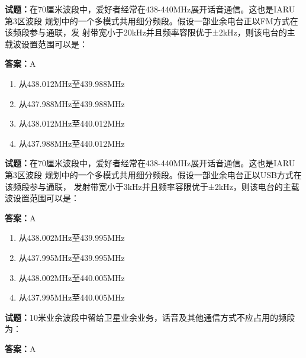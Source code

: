 \documentclass{ctexbook}
\begin{document}
\textbf{试题：}在70厘米波段中，爱好者经常在438-440MHz展开话音通信。这也是IARU第3区波段
规划中的一个多模式共用细分频段。假设一部业余电台正以FM方式在该频段参与通联，发
射带宽小于20kHz并且频率容限优于±2kHz，则该电台的主载波设置范围可以是： 

\textbf{答案：}A 


\begin{enumerate}[leftmargin=3em]
  \item 从438.012MHz至439.988MHz 

  \item 从437.988MHz至439.988MHz 

  \item 从438.012MHz至440.012MHz 

  \item 从437.988MHz至440.012MHz 

\end{enumerate}





\vspace{1em}

\textbf{试题：}在70厘米波段中，爱好者经常在438-440MHz展开话音通信。这也是IARU第3区波段
规划中的一个多模式共用细分频段。假设一部业余电台正以USB方式在该频段参与通联，
发射带宽小于3kHz并且频率容限优于±2kHz，则该电台的主载波设置范围可以是： 

\textbf{答案：}A 

\begin{enumerate}[leftmargin=3em]
  \item 从438.002MHz至439.995MHz 

  \item 从437.995MHz至439.995MHz 

  \item 从438.002MHz至440.005MHz 

  \item 从437.995MHz至440.005MHz 

\end{enumerate}





\vspace{1em}

\textbf{试题：}10米业余波段中留给卫星业余业务，话音及其他通信方式不应占用的频段为： 

\textbf{答案：}A 
\end{document}
